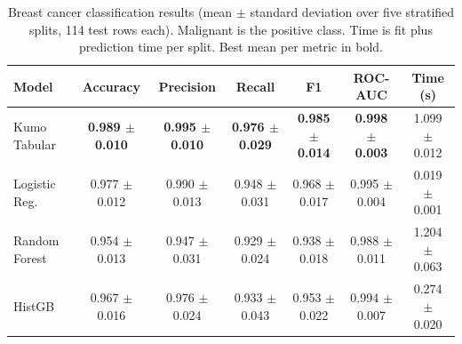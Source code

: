\begin{table}[t]
\centering
\caption{Breast cancer classification results (mean $\pm$ standard deviation over five stratified splits, 114 test rows each). Malignant is the positive class. Time is fit plus prediction time per split. Best mean per metric in bold.}
\label{tab:classification}
\setlength{\tabcolsep}{5pt}
\begin{tabular}{lcccccc}
\toprule
Model & Accuracy & Precision & Recall & F1 & ROC-AUC & Time (s) \\
\midrule
Kumo Tabular & \textbf{0.989 $\pm$ 0.010} & \textbf{0.995 $\pm$ 0.010} & \textbf{0.976 $\pm$ 0.029} & \textbf{0.985 $\pm$ 0.014} & \textbf{0.998 $\pm$ 0.003} & 1.099 $\pm$ 0.012 \\
Logistic Reg. & 0.977 $\pm$ 0.012 & 0.990 $\pm$ 0.013 & 0.948 $\pm$ 0.031 & 0.968 $\pm$ 0.017 & 0.995 $\pm$ 0.004 & 0.019 $\pm$ 0.001 \\
Random Forest & 0.954 $\pm$ 0.013 & 0.947 $\pm$ 0.031 & 0.929 $\pm$ 0.024 & 0.938 $\pm$ 0.018 & 0.988 $\pm$ 0.011 & 1.204 $\pm$ 0.063 \\
HistGB & 0.967 $\pm$ 0.016 & 0.976 $\pm$ 0.024 & 0.933 $\pm$ 0.043 & 0.953 $\pm$ 0.022 & 0.994 $\pm$ 0.007 & 0.274 $\pm$ 0.020 \\
\bottomrule
\end{tabular}
\end{table}

